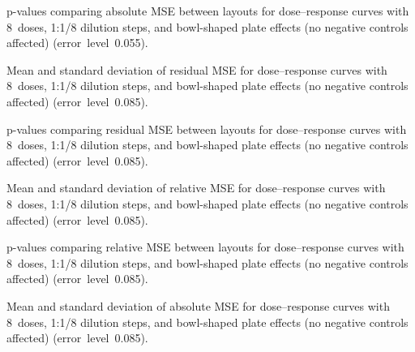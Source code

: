 \begin{table}[p]
    \centering
    \small
    
    \caption{p-values comparing absolute \ECIC{} MSE between layouts for dose--response curves with 8~doses, 1:1/8 dilution steps, and bowl-shaped plate effects (no negative controls affected) (error~level~0.055).}
    \label{tab:dr-absic50-pvalues-8doses-dil8-bowl-0.055}
\end{table}

\begin{table}[p]
    \centering
    \small
    
    \caption{Mean and standard deviation of residual MSE for dose--response curves with 8~doses, 1:1/8 dilution steps, and bowl-shaped plate effects (no negative controls affected) (error~level~0.085).}
    \label{tab:dr-residuals-mean-std-8doses-dil8-bowl-0.085}
\end{table}

\begin{table}[p]
    \centering
    \small
    
    \caption{p-values comparing residual MSE between layouts for dose--response curves with 8~doses, 1:1/8 dilution steps, and bowl-shaped plate effects (no negative controls affected) (error~level~0.085).}
    \label{tab:dr-residuals-pvalues-8doses-dil8-bowl-0.085}
\end{table}

\begin{table}[p]
    \centering
    \small
    
    \caption{Mean and standard deviation of relative \ECIC{} MSE for dose--response curves with 8~doses, 1:1/8 dilution steps, and bowl-shaped plate effects (no negative controls affected) (error~level~0.085).}
    \label{tab:dr-relic50-mean-std-8doses-dil8-bowl-0.085}
\end{table}

\begin{table}[p]
    \centering
    \small
    
    \caption{p-values comparing relative \ECIC{} MSE between layouts for dose--response curves with 8~doses, 1:1/8 dilution steps, and bowl-shaped plate effects (no negative controls affected) (error~level~0.085).}
    \label{tab:dr-relic50-pvalues-8doses-dil8-bowl-0.085}
\end{table}

\begin{table}[p]
    \centering
    \small
    
    \caption{Mean and standard deviation of absolute \ECIC{} MSE for dose--response curves with 8~doses, 1:1/8 dilution steps, and bowl-shaped plate effects (no negative controls affected) (error~level~0.085).}
    \label{tab:dr-absic50-mean-std-8doses-dil8-bowl-0.085}
\end{table}

